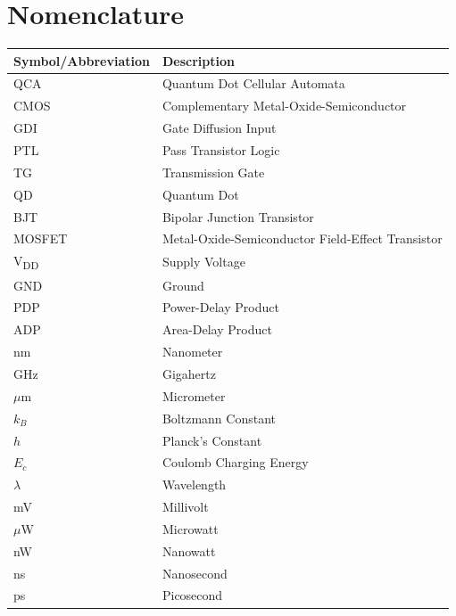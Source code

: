 \documentclass[12pt,a4paper,twoside]{report}
\begin{document}
\listoffigures

\listoftables

\chapter*{Nomenclature}

\begin{tabularx}{\textwidth}{lX}
\toprule
\textbf{Symbol/Abbreviation} & \textbf{Description} \\
\midrule
QCA & Quantum Dot Cellular Automata \\
CMOS & Complementary Metal-Oxide-Semiconductor \\
GDI & Gate Diffusion Input \\
PTL & Pass Transistor Logic \\
TG & Transmission Gate \\
QD & Quantum Dot \\
BJT & Bipolar Junction Transistor \\
MOSFET & Metal-Oxide-Semiconductor Field-Effect Transistor \\
V\textsubscript{DD} & Supply Voltage \\
GND & Ground \\
PDP & Power-Delay Product \\
ADP & Area-Delay Product \\
nm & Nanometer \\
GHz & Gigahertz \\
$\mu$m & Micrometer \\
$k_B$ & Boltzmann Constant \\
$h$ & Planck's Constant \\
$E_c$ & Coulomb Charging Energy \\
$\lambda$ & Wavelength \\
mV & Millivolt \\
$\mu$W & Microwatt \\
nW & Nanowatt \\
ns & Nanosecond \\
ps & Picosecond \\
\bottomrule
\end{tabularx}
\end{document}

